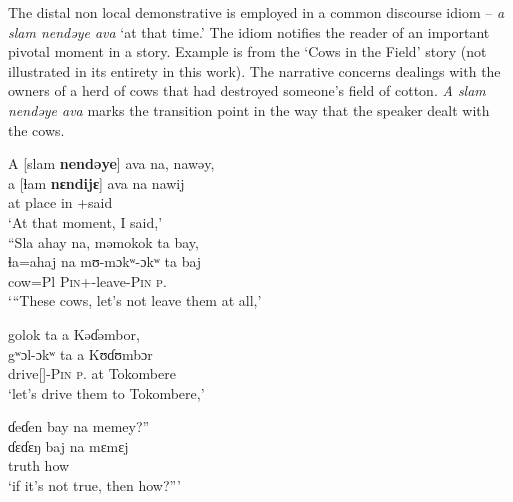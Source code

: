 The distal non local demonstrative is employed in a common discourse idiom  -- \textit{a slam nendəye ava} ‘at that time.’ The idiom notifies the reader of an important pivotal moment in a story. Example  is from the ‘Cows in the Field’ story (not illustrated in its entirety in this work). The narrative concerns dealings with the owners of a herd of cows that had destroyed someone’s field of cotton. \textit{A slam nendəye ava} marks the transition point in the way that the speaker dealt with the cows. 


\ea \label{ex:3:63}
A  [slam  \textbf{nendəye}]  ava  na,  nawəy,\\
\gll  a   [ɬam   \textbf{nɛndijɛ}]   ava   na    nawij\\
      at  place      {\DEM}          in   {\PSP}   {\oneS}+said\\
\glt ‘At that moment, I said,’\\
      
 \medskip
  “Sla  ahay  na,  məmokok  ta  bay,  \\
\gll ɬa=ahaj   na   mʊ-mɔkʷ-ɔkʷ ta baj \\
cow=Pl  {\PSP}  \textsc{Pin}+{\HOR}-leave-\textsc{Pin}   \textsc{p}.{\DO}   {\NEG}   \\
\glt ‘“These cows, let’s not leave them at all,’

\medskip
golok ta  a  Kəɗəmbor,\\
\gll gʷɔl-ɔkʷ ta  a  Kʊɗʊmbɔr\\
     drive[{\IMP}]-\textsc{Pin} \textsc{p}.{\DO}   at   Tokombere\\
\glt ‘let’s drive them to Tokombere,’

\medskip
ɗeɗen  bay  na  memey?”\\
\gll ɗɛɗɛŋ   baj     na      mɛmɛj\\
truth  {\NEG}   {\PSP}   how \\   
\glt  ‘if it’s not true, then how?”’
\z

